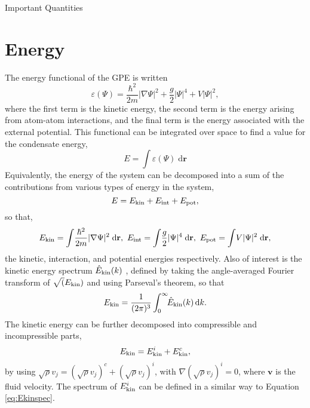 \begin{chapter}{Important Quantities\label{app:ImpQuantities}}
\section{\label{appsection:energy} Energy}
The energy functional of the GPE is written
\begin{equation}
\varepsilon(\Psi) = \frac{\hbar^2}{2m}|\nabla\Psi|^2 + \frac{g}{2}|\Psi|^4 + V|\Psi|^2,
\label{eq:Efn}
\end{equation}
where the first term is the kinetic energy, the second term is the energy arising from atom-atom interactions, and the final term is the energy associated with the external potential. This functional can be integrated over space to find a value for the condensate energy,
\begin{equation}
E = \int\!\varepsilon(\Psi)\;\mathrm{d}\mathbf{r}
\label{eq:Efn}
\end{equation}
Equivalently, the energy of the system can be decomposed into a sum of the contributions from various types of energy in the system,
\begin{equation*}
E = E_{\rm kin} + E_{\rm int} + E_{\mathrm{pot}},
\label{eq:Esplit}
\end{equation*}
so that,
\begin{equation}
E_{\rm kin} = \int\!\frac{\hbar^2}{2m}|\nabla\Psi|^2\;\mathrm{d}\mathbf{r},~E_{\rm int}=\int\!\frac{g}{2}|\Psi|^4\;\mathrm{d}\mathbf{r},~E_{\mathrm{pot}}=\int\!V|\Psi|^2\;\mathrm{d}\mathbf{r},
\label{eq:Esplitdef}
\end{equation}
the kinetic, interaction, and potential energies respectively. Also of interest is the kinetic energy spectrum $\hat{E}_{\rm kin}(k)$ \cite{Nore}, defined by taking the angle-averaged Fourier transform of $\sqrt(E_{\rm kin})$ and using Parseval's theorem, so that
\begin{equation}
E_{\rm kin} = \frac{1}{(2\pi)^3}\int^\infty_0\!\!\hat{E}_{\rm kin}(k)\,\mathrm{d}k.
\label{eq:Ekinspec}
\end{equation}
The kinetic energy can be further decomposed into compressible and incompressible parts,
\begin{equation*}
E_{\rm kin} = E^i_{\rm kin} + E^c_{\rm kin},
\label{eq:Esplitdef}
\end{equation*}
by using $\sqrt{\rho}v_j = (\sqrt{\rho}v_j)^c + (\sqrt{\rho}v_j)^i$, with $\nabla(\sqrt{\rho}v_j)^i=0$, where $\mathbf{v}$ is the fluid velocity. The spectrum of $E^i_{\rm kin}$ can be defined in a similar way to Equation \ref{eq:Ekinspec}.



\end{chapter}
